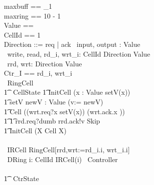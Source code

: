 \documentclass[10pt]{article}
\begin{document}
\begin{circus}

maxbuff == \nat_1 \\
maxring == 10 - 1 \\
Value == \nat \\
CellId == 1  \\
Direction ::=  req | ack
\also \circchannel\ input, output : Value \\
\circchannel\ write, read, rd\_i, wrt\_i: CellId \cross Direction \cross Value \\
\circchannel\ rrd, wrt: Direction \cross Value \\
\circchannelset Ctr\_I == \lchanset rd\_i, wrt\_i \rchanset \\

\circprocess\ RingCell \circdef\\
\circbegin
\t1 \circstate\ CellState 
\t1 InitCell \circdef (\Intchoice x : Value \circspot setV(x)) \\
\t1 setV \circdef \circval newV : Value \circspot (v:= newV) \\
\t1 Cell \circdef ((wrt.req?x \then setV(x)) \circseq (wrt.ack.x \then \Skip))  \\
\t1 \t1         \extchoice rrd.req?dumb \then rrd.ack!v \then Skip \\
\t1 \circspot InitCell \circseq (\circmu X \circspot Cell \circseq X)
\\
\circend
\\
\circprocess\ IRCell \circdef RingCell[rrd,wrt:=rd\_i.i, wrt\_i.i]
\\
\circprocess\ DRing \circdef \Interleave i: CellId \circspot IRCell(i)
\also
\circprocess\ Controller \circdef \\
\circbegin\\
\t1 \circstate\ CtrState  \\


\end{circus}
\end{document}
